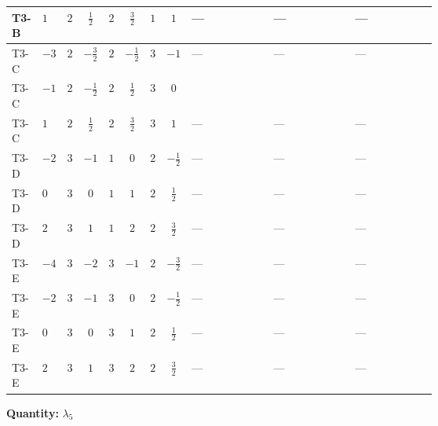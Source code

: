 \documentclass[8pt]{article}
\begin{document}
\begin{landscape}
\begin{longtable}{@{}llcccccc >{\raggedright\arraybackslash}p{0.21\linewidth} >{\raggedright\arraybackslash}p{0.21\linewidth} >{\raggedright\arraybackslash}p{0.21\linewidth}@{}}
\midrule
T3-B & $1$ & $2$ & $\frac{1}{2}$ & $2$ & $\frac{3}{2}$ & $1$ & $1$ & --- & --- & --- \\
\midrule
T3-C & $-3$ & $2$ & $-\frac{3}{2}$ & $2$ & $-\frac{1}{2}$ & $3$ & $-1$ & --- & --- & --- \\
\midrule
T3-C & $-1$ & $2$ & $-\frac{1}{2}$ & $2$ & $\frac{1}{2}$ & $3$ & $0$ & \scriptsize\adjustbox{max width=\linewidth}{$\begin{gathered} -4 {\lambda_{H H^\dagger S_1^\dagger S_2^\dagger}^{\rm Cross}} \left({\lambda_{7}}\right)^{*}\end{gathered}$} & \scriptsize\adjustbox{max width=\linewidth}{$\begin{gathered} +4 {\lambda_{11}} \left({\lambda_{7}}\right)^{*}\end{gathered}$} & \scriptsize\adjustbox{max width=\linewidth}{$\begin{gathered} +4 \left({\lambda_{8}}\right)^{*} (\left({\lambda_{10}}\right)^{*}-\left({\lambda_{H H^\dagger S_1^\dagger S_2^\dagger}^{\rm Cross}}\right)^{*})\end{gathered}$} \\
\midrule
T3-C & $1$ & $2$ & $\frac{1}{2}$ & $2$ & $\frac{3}{2}$ & $3$ & $1$ & --- & --- & --- \\
\midrule
T3-D & $-2$ & $3$ & $-1$ & $1$ & $0$ & $2$ & $-\frac{1}{2}$ & --- & --- & --- \\
\midrule
T3-D & $0$ & $3$ & $0$ & $1$ & $1$ & $2$ & $\frac{1}{2}$ & --- & --- & --- \\
\midrule
T3-D & $2$ & $3$ & $1$ & $1$ & $2$ & $2$ & $\frac{3}{2}$ & --- & --- & --- \\
\midrule
T3-E & $-4$ & $3$ & $-2$ & $3$ & $-1$ & $2$ & $-\frac{3}{2}$ & --- & --- & --- \\
\midrule
T3-E & $-2$ & $3$ & $-1$ & $3$ & $0$ & $2$ & $-\frac{1}{2}$ & --- & --- & --- \\
\midrule
T3-E & $0$ & $3$ & $0$ & $3$ & $1$ & $2$ & $\frac{1}{2}$ & --- & --- & --- \\
\midrule
T3-E & $2$ & $3$ & $1$ & $3$ & $2$ & $2$ & $\frac{3}{2}$ & --- & --- & --- \\
\midrule
\bottomrule
\end{longtable}
\clearpage
\noindent\textbf{Quantity: }$\lambda_5$\par\smallskip

\end{landscape}
\end{document}
